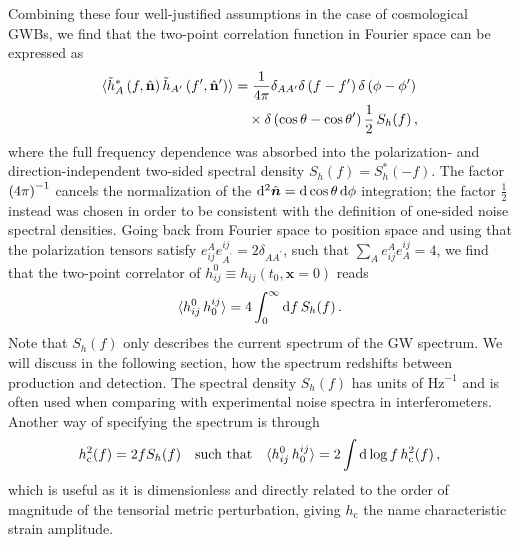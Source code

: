 Combining these four well-justified assumptions in the case of cosmological \acp{GWB}, we find that the two-point correlation function in Fourier space can be expressed as
\begin{align}
	\begin{split}
		\langle \tilde{h}_A^* \left( f, \hat{\mathbf{n}} \right) \tilde{h}_{A^\prime} \left( f^\prime, \hat{\mathbf{n}}^\prime \right) \rangle &= \frac{1}{4\pi} \delta_{A A^\prime} \delta\left( f - f^\prime \right) \delta\left( \phi - \phi^\prime \right) \\
		& \quad \times \delta \left( \cos \theta - \cos \theta^\prime \right) \frac{1}{2} \, S_h(f) \, ,
		\label{eq:ensembleaverage}
	\end{split}
\end{align}
where the full frequency dependence was absorbed into the polarization- and direction-independent two-sided spectral density $S_h(f) = S_h^*(-f)$. The factor $\left( 4 \pi \right)^{-1}$ cancels the normalization of the $\mathop{}\!\mathrm{d}^2 \hat{\bm{n}} = \mathop{}\!\mathrm{d} \cos \theta \mathop{}\!\mathrm{d} \phi$ integration; the factor $\frac{1}{2}$ instead  was chosen in order to be consistent with the definition of one-sided noise spectral densities. Going back from Fourier space to position space and using that the polarization tensors satisfy $e_{ij}^A e^{ij}_{A^{\prime}} = 2 \delta_{A A^{\prime}}$, such that $\sum_A e_{ij}^A e^{ij}_{A} = 4$, we find that the two-point correlator of $h_{ij}^0 \equiv h_{ij}(t_0, \bm{x} = 0)$ reads
\begin{align}
	\langle h_{ij}^0 \, h^{ij}_0 \rangle = 4 \int_{0}^{\infty} \mathop{}\!\mathrm{d} f \, S_h(f) \, .
\end{align}
Note that $S_h(f)$ only describes the current spectrum of the \ac{GW} spectrum. We will discuss in the following section, how the spectrum redshifts between  production and detection. The spectral density $S_h(f)$ has units of $\text{Hz}^{-1}$ and is often used when comparing with experimental noise spectra in interferometers. Another way of specifying the spectrum is through
\begin{align}
	h_\text{c}^2(f) = 2 f S_h(f) \quad \text{such that} \quad \langle h_{ij}^0 \, h^{ij}_0 \rangle = 2 \int \mathop{}\!\mathrm{d} \log f \, h_\text{c}^2(f) \, ,
\end{align}
which is useful as it is dimensionless and directly related to the order of magnitude of the tensorial metric perturbation, giving $h_\text{c}$ the name characteristic strain amplitude.

